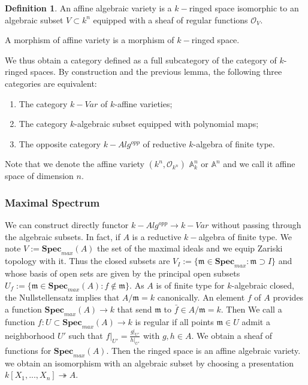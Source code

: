 \documentclass[12pt,a4paper,english]{article}
\theoremstyle{plain}
\theoremstyle{definition}
\newtheorem{defi}{Definition}
\theoremstyle{remark}
\newcommand{\spm}{\mathbf{Spec}_{max}}
\begin{document}
\begin{defi}
An affine algebraic variety is a $k-$ringed space isomorphic to an algebraic subset $V\subset k^{n}$ equipped with a sheaf of regular functions $\mathcal{O}_{V}$.

A morphism of affine variety is a morphism of $k-$ringed space.
\end{defi}
We thus obtain a category defined as a full subcategory of the category of $k$-ringed spaces. By construction and the previous lemma, the following three categories are equivalent:
\begin{enumerate}
    \item The category $k-Var$ of $k$-affine varieties;
    \item The category $k$-algebraic subset equipped with polynomial maps;
    \item The opposite category $k-Alg^{opp}$ of reductive $k$-algebra of finite type.
\end{enumerate}

Note that we denote the affine variety $(k^{n},\mathcal{O}_{k^{n}})$ $\mathbb{A}^{n}_{k}$ or $\mathbb{A}^{n}$ and we call it affine space of dimension $n$.



\subsubsection{Maximal Spectrum }
We can construct directly functor $k-Alg^{opp}\rightarrow k-Var$ without passing through the algebraic subsets. In fact, if $A$ is a reductive $k-$algebra of finite type. We note $V:=\spm(A)$ the set of the maximal ideals and we equip Zariski topology with it. Thus the closed subsets are $V_{I}:=\{\mathfrak{m}\in\spm:\mathfrak{m}\supset I\}$ and whose basis of open sets are given by the principal open subsets $U_{f}:=\{\mathfrak{m}\in\spm(A):f\not\in \mathfrak{m}\}$. As $A$ is of finite type for $k$-algebraic closed, the Nullstellensatz implies that $A/\mathfrak{m}=k$ canonically. An element $f$ of $A$ provides a function $\spm(A)\rightarrow k$ that send $\mathfrak{m}$ to $\bar{f}\in A/\mathfrak{m}=k$. Then We call a function $f:U\subset\spm(A)\rightarrow  k $ is regular if all points $\mathfrak{m}\in U$ admit a neighborhood $U'$ such that $f|_{U'}=\frac{g|_{U'}}{h|_{U'}}$ with $g, h\in A$. We obtain a sheaf of functions for $\spm(A)$. Then the ringed space is an affine algebraic variety. we obtain an isomorphism with an algebraic subset by choosing a presentation $  k[X_{1},...,X_{n}]\twoheadrightarrow A$.
\end{document}
